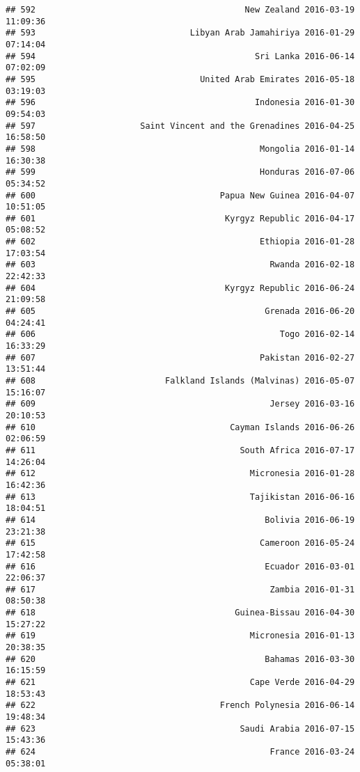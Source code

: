 \documentclass[
]{article}
\begin{document}
\begin{verbatim}
## 592                                          New Zealand 2016-03-19 11:09:36
## 593                               Libyan Arab Jamahiriya 2016-01-29 07:14:04
## 594                                            Sri Lanka 2016-06-14 07:02:09
## 595                                 United Arab Emirates 2016-05-18 03:19:03
## 596                                            Indonesia 2016-01-30 09:54:03
## 597                     Saint Vincent and the Grenadines 2016-04-25 16:58:50
## 598                                             Mongolia 2016-01-14 16:30:38
## 599                                             Honduras 2016-07-06 05:34:52
## 600                                     Papua New Guinea 2016-04-07 10:51:05
## 601                                      Kyrgyz Republic 2016-04-17 05:08:52
## 602                                             Ethiopia 2016-01-28 17:03:54
## 603                                               Rwanda 2016-02-18 22:42:33
## 604                                      Kyrgyz Republic 2016-06-24 21:09:58
## 605                                              Grenada 2016-06-20 04:24:41
## 606                                                 Togo 2016-02-14 16:33:29
## 607                                             Pakistan 2016-02-27 13:51:44
## 608                          Falkland Islands (Malvinas) 2016-05-07 15:16:07
## 609                                               Jersey 2016-03-16 20:10:53
## 610                                       Cayman Islands 2016-06-26 02:06:59
## 611                                         South Africa 2016-07-17 14:26:04
## 612                                           Micronesia 2016-01-28 16:42:36
## 613                                           Tajikistan 2016-06-16 18:04:51
## 614                                              Bolivia 2016-06-19 23:21:38
## 615                                             Cameroon 2016-05-24 17:42:58
## 616                                              Ecuador 2016-03-01 22:06:37
## 617                                               Zambia 2016-01-31 08:50:38
## 618                                        Guinea-Bissau 2016-04-30 15:27:22
## 619                                           Micronesia 2016-01-13 20:38:35
## 620                                              Bahamas 2016-03-30 16:15:59
## 621                                           Cape Verde 2016-04-29 18:53:43
## 622                                     French Polynesia 2016-06-14 19:48:34
## 623                                         Saudi Arabia 2016-07-15 15:43:36
## 624                                               France 2016-03-24 05:38:01

\end{verbatim}
\end{document}
